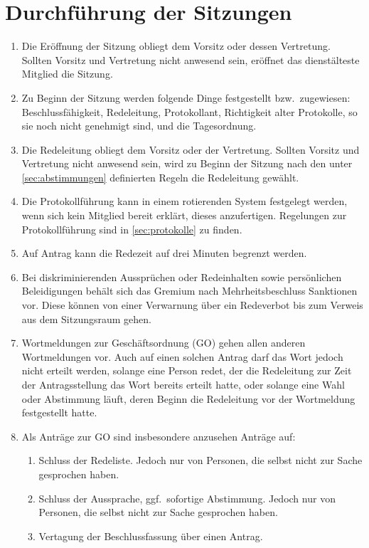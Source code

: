 \section{Durchführung der Sitzungen}
\label{sec:Sitzungen}
\begin{enumerate}
	\item Die Eröffnung der Sitzung obliegt dem Vorsitz oder dessen Vertretung.
	Sollten Vorsitz und Vertretung nicht anwesend sein, eröffnet das dienstälteste Mitglied die Sitzung.
	\item Zu Beginn der Sitzung werden folgende Dinge festgestellt bzw.\ zugewiesen: Beschlussfähigkeit, Redeleitung, Protokollant, Richtigkeit alter Protokolle, so sie noch nicht genehmigt sind, und die Tagesordnung.
	\item Die Redeleitung obliegt dem Vorsitz oder der Vertretung.
	Sollten Vorsitz und Vertretung nicht anwesend sein, wird zu Beginn der Sitzung nach den unter \ref{sec:abstimmungen} definierten Regeln die Redeleitung gewählt.
	\item Die Protokollführung kann in einem rotierenden System festgelegt werden, wenn sich kein Mitglied bereit erklärt, dieses anzufertigen.
	Regelungen zur Protokollführung sind in \ref{sec:protokolle} zu finden.
	\item Auf Antrag kann die Redezeit auf drei Minuten begrenzt werden.
	\item Bei diskriminierenden Aussprüchen oder Redeinhalten sowie persönlichen Beleidigungen behält sich das Gremium nach Mehrheitsbeschluss Sanktionen vor.
	Diese können von einer Verwarnung über ein Redeverbot bis zum Verweis aus dem Sitzungsraum gehen.
	\item Wortmeldungen zur Geschäftsordnung (GO) gehen allen anderen Wortmeldungen vor.
	Auch auf einen solchen Antrag darf das Wort jedoch nicht erteilt werden, solange eine Person redet, der die Redeleitung zur Zeit der Antragsstellung das Wort bereits erteilt hatte, oder solange eine Wahl oder Abstimmung läuft, deren Beginn die Redeleitung vor der Wortmeldung festgestellt hatte.
	\item Als Anträge zur GO sind insbesondere anzusehen Anträge auf:
	\begin{enumerate}
		\item Schluss der Redeliste.
		Jedoch nur von Personen, die selbst nicht zur Sache gesprochen haben.
		\item Schluss der Aussprache, ggf.\ sofortige Abstimmung.
		Jedoch nur von Personen, die selbst nicht zur Sache gesprochen haben.
		\item Vertagung der Beschlussfassung über einen Antrag.

\end{enumerate}
\end{enumerate}
